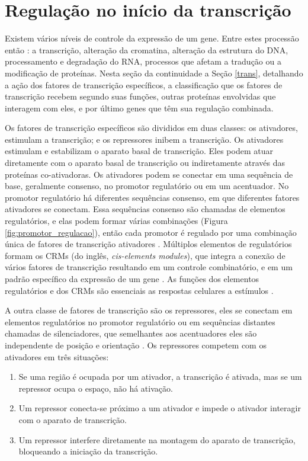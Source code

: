 \section{Regulação no início da transcrição} \label{S3}

Existem vários níveis de controle da expressão de um gene. Entre estes processão então : a transcrição, alteração da cromatina, alteração da estrutura do DNA, processamento e degradação do RNA, processos que afetam a tradução ou a modificação de proteínas. Nesta seção da continuidade a Seção \ref{trans}, detalhando a ação dos fatores de transcrição específicos, a classificação que os fatores de transcrição recebem segundo suas funções, outras proteínas envolvidas que interagem com eles, e por último genes que têm sua regulação combinada.

Os fatores de transcrição específicos são divididos em duas classes: os ativadores, estimulam a transcrição; e os repressores inibem a transcrição. Os ativadores estimulam e estabilizam o aparato basal de transcrição. Eles podem atuar diretamente com o aparato basal de transcrição ou indiretamente através das proteínas co-ativadoras. Os ativadores podem se conectar em uma sequência de base, geralmente consenso, no promotor regulatório ou em um acentuador. No promotor regulatório há diferentes sequências consenso, em que diferentes fatores ativadores se conectam. Essa sequências consenso são chamadas de elementos regulatórios, e elas podem formar várias combinações (Figura \ref{fig:promotor_regulacao}), então cada promotor é regulado por uma combinação única de fatores de transcrição ativadores \cite{Pierce2012}. Múltiplos elementos de regulatórios formam os CRMs (do inglês, \textit{cis-elements modules}), que integra a conexão de vários fatores de transcrição resultando em um controle combinatório, e em um padrão específico da expressão de um gene \cite{Priest2009}. As funções dos elementos regulatórios e dos CRMs são essenciais as respostas celulares a estímulos \cite{Priest2009}.

A outra classe de fatores de transcrição são os repressores, eles se conectam em elementos regulatórios no promotor regulatório ou em sequências distantes chamadas de silenciadores, que semelhantes aos acentuadores eles são independente de posição e orientação \cite{Pierce2012}. Os repressores competem com os ativadores em três situações:

\begin{enumerate}
\item Se uma região é ocupada por um ativador, a transcrição é ativada, mas se um repressor ocupa o espaço, não há ativação.

\item Um repressor conecta-se próximo a um ativador e impede o ativador interagir com o aparato de transcrição.

\item Um repressor interfere diretamente na montagem do aparato de transcrição, bloqueando a iniciação da transcrição.

\end{enumerate}

